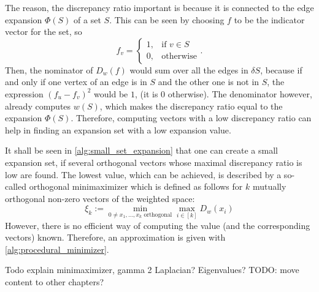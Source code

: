 The reason, the discrepancy ratio important is because it is connected to the edge expansion $\Phi(S)$ of a set $S$. This can be seen by choosing $f$ to be the indicator vector for the set, so \begin{equation}
	f_v=\begin{cases}
	1, & \text{if } v\in S\\
	0, & \text{otherwise}
	\end{cases}.
\end{equation} Then, the nominator of $D_w(f)$ would sum over all the edges in $\delta S$, because if and only if one vertex of an edge is in $S$ and the other one is not in $S$, the expression $(f_u - f_v)^2 $ would be $1$, (it is $0$ otherwise). The denominator however, already computes $w(S)$, which makes the discrepancy ratio equal to the expansion $\Phi(S)$. Therefore, computing vectors with a low discrepancy ratio can help in finding an expansion set with a low expansion value.


It shall be seen in \cref{alg:small_set_expansion} that one can create a small expansion set, if several orthogonal vectors whose maximal discrepancy ratio is low are found. The lowest value, which can be achieved, is described by a so-called orthogonal minimaximizer which is defined as follows for $k$ mutually orthogonal non-zero vectors of the weighted space:
\begin{equation}\label{eq:xi}
\xi_k := \min_{0 \neq x_1, \ldots , x_k  \text{ orthogonal}} \max_{i \in [k]} D_w(x_i)
\end{equation}
However, there is no efficient way of computing the value (and the corresponding vectors) known. Therefore, an approximation is given with \cref{alg:procedural_minimizer}.



Todo explain minimaximizer, gamma 2
Laplacian? Eigenvalues?
TODO: move content to other chapters?



